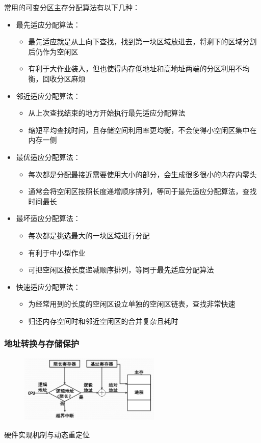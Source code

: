 \documentclass[cs4size,a4paper,10pt]{ctexart}
\begin{document}
		常用的可变分区主存分配算法有以下几种：
		\begin{itemize}
			\item 最先适应分配算法：
			\begin{itemize}
				\item 最先适应就是从上向下查找，找到第一块区域放进去，将剩下的区域分割后仍作为空闲区
				\item 有利于大作业装入，但也使得内存低地址和高地址两端的分区利用不均衡，回收分区麻烦
			\end{itemize}
			\item 邻近适应分配算法：
			\begin{itemize}
				\item 从上次查找结束的地方开始执行最先适应分配算法
				\item 缩短平均查找时间，且存储空间利用率更均衡，不会使得小空闲区集中在内存一侧
			\end{itemize}
			\item 最优适应分配算法：
			\begin{itemize}
				\item 每次都是分配最接近需要使用大小的部分，会生成很多很小的内存内零头
				\item 通常会将空闲区按照长度递增顺序排列，等同于最先适应分配算法，查找时间最长
			\end{itemize}
			\item 最坏适应分配算法：
			\begin{itemize}
				\item 每次都是挑选最大的一块区域进行分配
				\item 有利于中小型作业
				\item 可把空闲区按长度递减顺序排列，等同于最先适应分配算法
			\end{itemize}
			\item 快速适应分配算法：
			\begin{itemize}
				\item 为经常用到的长度的空闲区设立单独的空闲区链表，查找非常快速
				\item 归还内存空间时和邻近空闲区的合并复杂且耗时
			\end{itemize}
		\end{itemize}

		\subsubsection{地址转换与存储保护}
		\begin{figure}[H]
			\centering
			\includegraphics[width=0.6\textwidth]{img/3.2.3.2}
		\end{figure}
		硬件实现机制与动态重定位
\end{document}
